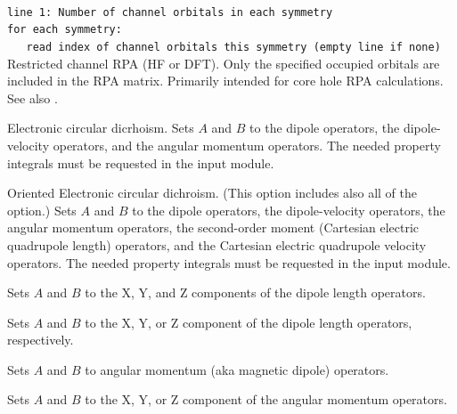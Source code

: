 \begin{description}

\item{}\\
\verb|line 1: Number of channel orbitals in each symmetry|\\
\verb|for each symmetry:|\\
\verb|   read index of channel orbitals this symmetry (empty line if none)|\\
Restricted channel RPA (HF or DFT).
Only the specified occupied orbitals are included in the RPA matrix.
Primarily intended for core hole RPA calculations.
See also .

\item{}
Electronic circular dicrhoism.
Sets $A$ and $B$ to the dipole operators,
the dipole-velocity operators,
and the angular momentum operators.
The needed property integrals must be requested in the  input module.

\item{}
Oriented Electronic circular dichroism.
(This option includes also all of the  option.)
Sets $A$ and $B$ to the dipole operators,
the dipole-velocity operators,
the angular momentum operators,
the second-order moment (Cartesian electric quadrupole
length) operators, and
the Cartesian electric quadrupole velocity operators.
The needed property integrals must be requested in the  input module.

\item{}
Sets $A$ and $B$ to the X, Y, and Z components of the dipole length operators.

\item{}
Sets $A$ and $B$ to the X, Y, or Z component of the dipole length operators, respectively.

\item{}
Sets $A$ and $B$ to angular momentum (aka magnetic dipole) operators.

\item{}
Sets $A$ and $B$ to the X, Y, or Z component of the angular momentum operators.


\end{description}
